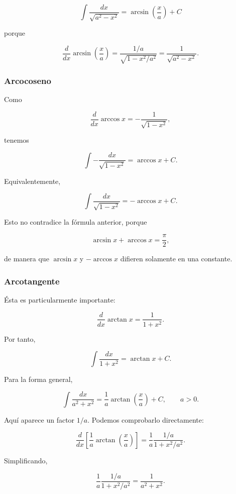 \documentclass[12pt]{article}
\theoremstyle{definition}
\theoremstyle{remark}
\begin{document}
\[
\boxed{
\int\frac{dx}{\sqrt{a^2-x^2}}
=
\arcsin\left(\frac{x}{a}\right)+C
}
\]

porque

\[
\frac{d}{dx}
\arcsin\left(\frac{x}{a}\right)
=
\frac{1/a}{\sqrt{1-x^2/a^2}}
=
\frac{1}{\sqrt{a^2-x^2}}.
\]

\subsubsection*{Arcocoseno}

Como

\[
\frac{d}{dx}\arccos x
=
-\frac{1}{\sqrt{1-x^2}},
\]

tenemos

\[
\boxed{
\int-\frac{dx}{\sqrt{1-x^2}}
=
\arccos x+C
}.
\]

Equivalentemente,

\[
\int\frac{dx}{\sqrt{1-x^2}}
=
-\arccos x+C.
\]

Esto no contradice la fórmula anterior, porque

\[
\arcsin x+\arccos x=\frac{\pi}{2},
\]

de manera que \(\arcsin x\) y \(-\arccos x\) difieren solamente
en una constante.

\subsubsection*{Arcotangente}

Ésta es particularmente importante:

\[
\frac{d}{dx}\arctan x
=
\frac{1}{1+x^2}.
\]

Por tanto,

\[
\boxed{
\int\frac{dx}{1+x^2}
=
\arctan x+C
}.
\]

Para la forma general,

\[
\boxed{
\int\frac{dx}{a^2+x^2}
=
\frac1a\arctan\left(\frac{x}{a}\right)+C,
\qquad a>0.
}
\]

Aquí aparece un factor \(1/a\). Podemos comprobarlo directamente:

\[
\frac{d}{dx}
\left[
\frac1a\arctan\left(\frac{x}{a}\right)
\right]
=
\frac1a
\frac{1/a}{1+x^2/a^2}.
\]

Simplificando,

\[
\frac1a
\frac{1/a}{1+x^2/a^2}
=
\frac{1}{a^2+x^2}.
\]
\end{document}
